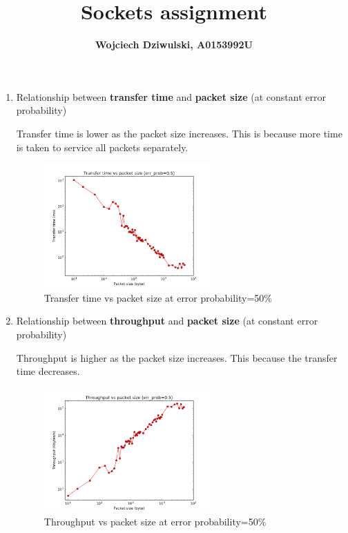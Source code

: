 \documentclass[a4paper]{article}
\title{Sockets assignment}
\author{\textbf{Wojciech Dziwulski, A0153992U}}
\date{}
\numberwithin{equation}{section}
\begin{document}
\maketitle

\begin{enumerate}
\item Relationship between \textbf{transfer time} and \textbf{packet size} (at constant error probability)

Transfer time is lower as the packet size increases. This is because more time is taken to service all packets separately.

\begin{figure}[h!]
	\centering
	\includegraphics[page=1,width=0.60\textwidth]{Ex4/timeVpacketsize.png}
	\caption{\label{fig:diagram}{Transfer time vs packet size at error probability=50\%}}
\end{figure}

\item Relationship between \textbf{throughput} and \textbf{packet size} (at constant error probability)

Throughput is higher as the packet size increases. This because the transfer time decreases.

\begin{figure}[h!]
	\centering
	\includegraphics[page=1,width=0.60\textwidth]{Ex4/throughputVpacketsize.png}
	\caption{\label{fig:diagram}{Throughput vs packet size at error probability=50\%}}
\end{figure}


\end{enumerate}
\end{document}
